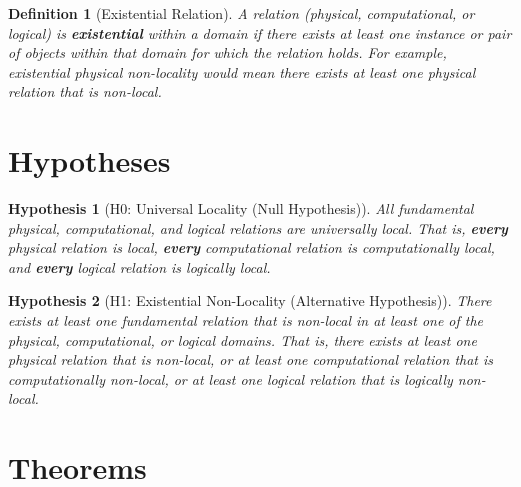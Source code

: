 \documentclass{article}
\newtheorem{definition}{Definition}
\newtheorem{hypothesis}{Hypothesis}
\begin{document}
	\begin{definition}[Existential Relation]
		A relation (physical, computational, or logical) is \textbf{existential} within a domain if there exists at least one instance or pair of objects within that domain for which the relation holds. For example, existential physical non-locality would mean there exists at least one physical relation that is non-local.
	\end{definition}

	\section{Hypotheses}

	\begin{hypothesis}[H0: Universal Locality (Null Hypothesis)]
		All fundamental physical, computational, and logical relations are universally local. That is, \textbf{every} physical relation is local, \textbf{every} computational relation is computationally local, and \textbf{every} logical relation is logically local.
	\end{hypothesis}

	\begin{hypothesis}[H1: Existential Non-Locality (Alternative Hypothesis)]
		There exists at least one fundamental relation that is non-local in at least one of the physical, computational, or logical domains. That is, there exists at least one physical relation that is non-local, or at least one computational relation that is computationally non-local, or at least one logical relation that is logically non-local.
	\end{hypothesis}

	\section{Theorems}
\end{document}
